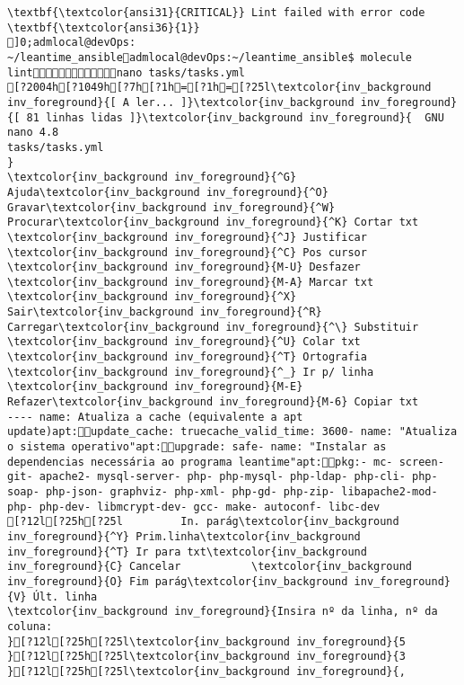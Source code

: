 \documentclass{scrartcl}
\begin{document}
\begin{Verbatim}
\textbf{\textcolor{ansi31}{CRITICAL}} Lint failed with error code \textbf{\textcolor{ansi36}{1}}
]0;admlocal@devOps: ~/leantime_ansibleadmlocal@devOps:~/leantime_ansible$ molecule lintnano tasks/tasks.yml 
[?2004h[?1049h[?7h[?1h=[?1h=[?25l\textcolor{inv_background inv_foreground}{[ A ler... ]}\textcolor{inv_background inv_foreground}{[ 81 linhas lidas ]}\textcolor{inv_background inv_foreground}{  GNU nano 4.8                                                tasks/tasks.yml                                                             }
\textcolor{inv_background inv_foreground}{^G} Ajuda\textcolor{inv_background inv_foreground}{^O} Gravar\textcolor{inv_background inv_foreground}{^W} Procurar\textcolor{inv_background inv_foreground}{^K} Cortar txt    \textcolor{inv_background inv_foreground}{^J} Justificar    \textcolor{inv_background inv_foreground}{^C} Pos cursor    \textcolor{inv_background inv_foreground}{M-U} Desfazer     \textcolor{inv_background inv_foreground}{M-A} Marcar txt
\textcolor{inv_background inv_foreground}{^X} Sair\textcolor{inv_background inv_foreground}{^R} Carregar\textcolor{inv_background inv_foreground}{^\} Substituir    \textcolor{inv_background inv_foreground}{^U} Colar txt     \textcolor{inv_background inv_foreground}{^T} Ortografia    \textcolor{inv_background inv_foreground}{^_} Ir p/ linha   \textcolor{inv_background inv_foreground}{M-E} Refazer\textcolor{inv_background inv_foreground}{M-6} Copiar txt
---- name: Atualiza a cache (equivalente a apt update)apt:update_cache: truecache_valid_time: 3600- name: "Atualiza o sistema operativo"apt:upgrade: safe- name: "Instalar as dependencias necessária ao programa leantime"apt:pkg:- mc- screen- git- apache2- mysql-server- php- php-mysql- php-ldap- php-cli- php-soap- php-json- graphviz- php-xml- php-gd- php-zip- libapache2-mod-php- php-dev- libmcrypt-dev- gcc- make- autoconf- libc-dev
[?12l[?25h[?25l         In. parág\textcolor{inv_background inv_foreground}{^Y} Prim.linha\textcolor{inv_background inv_foreground}{^T} Ir para txt\textcolor{inv_background inv_foreground}{C} Cancelar           \textcolor{inv_background inv_foreground}{O} Fim parág\textcolor{inv_background inv_foreground}{V} Últ. linha
\textcolor{inv_background inv_foreground}{Insira nº da linha, nº da coluna:                                                                                                         }[?12l[?25h[?25l\textcolor{inv_background inv_foreground}{5
}[?12l[?25h[?25l\textcolor{inv_background inv_foreground}{3
}[?12l[?25h[?25l\textcolor{inv_background inv_foreground}{,

\end{Verbatim}
\end{document}
